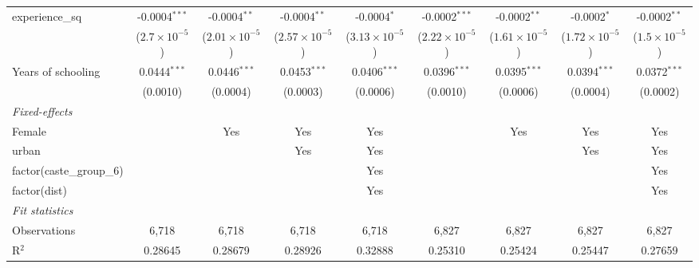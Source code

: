 \begin{table}[htbp]
\begin{tabular}{lcccccccc}
      experience\_sq            & -0.0004$^{***}$        & -0.0004$^{**}$          & -0.0004$^{**}$          & -0.0004$^{*}$           & -0.0002$^{***}$         & -0.0002$^{**}$          & -0.0002$^{*}$           & -0.0002$^{**}$\\   
                                & ($2.7\times 10^{-5}$)  & ($2.01\times 10^{-5}$)  & ($2.57\times 10^{-5}$)  & ($3.13\times 10^{-5}$)  & ($2.22\times 10^{-5}$)  & ($1.61\times 10^{-5}$)  & ($1.72\times 10^{-5}$)  & ($1.5\times 10^{-5}$)\\    
      Years of schooling        & 0.0444$^{***}$         & 0.0446$^{***}$          & 0.0453$^{***}$          & 0.0406$^{***}$          & 0.0396$^{***}$          & 0.0395$^{***}$          & 0.0394$^{***}$          & 0.0372$^{***}$\\   
                                & (0.0010)               & (0.0004)                & (0.0003)                & (0.0006)                & (0.0010)                & (0.0006)                & (0.0004)                & (0.0002)\\   
      \midrule
      \emph{Fixed-effects}\\
      Female                    &                        & Yes                     & Yes                     & Yes                     &                         & Yes                     & Yes                     & Yes\\  
      urban                     &                        &                         & Yes                     & Yes                     &                         &                         & Yes                     & Yes\\  
      factor(caste\_group\_6)   &                        &                         &                         & Yes                     &                         &                         &                         & Yes\\  
      factor(dist)              &                        &                         &                         & Yes                     &                         &                         &                         & Yes\\  
      \midrule
      \emph{Fit statistics}\\
      Observations              & 6,718                  & 6,718                   & 6,718                   & 6,718                   & 6,827                   & 6,827                   & 6,827                   & 6,827\\  
      R$^2$                     & 0.28645                & 0.28679                 & 0.28926                 & 0.32888                 & 0.25310                 & 0.25424                 & 0.25447                 & 0.27659\\  

\end{tabular}
\end{table}
